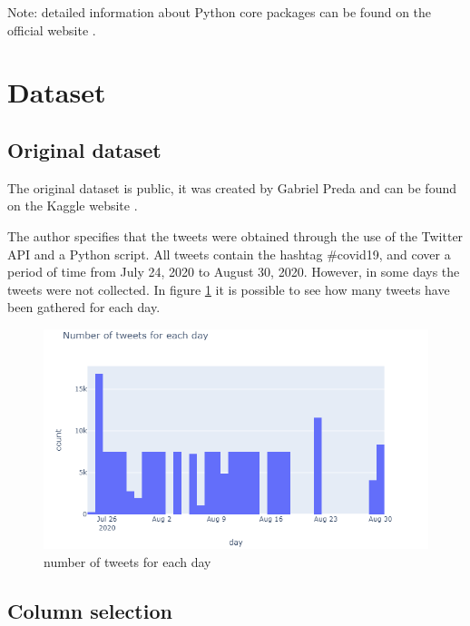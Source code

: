 \vspace{4mm}
Note: detailed information about Python core packages can be found on the official website \cite{python_website}. 


\section{Dataset}\label{sect_dataset}

\subsection*{Original dataset}

The original dataset is public, it was created by Gabriel Preda and can be found on the Kaggle website \cite{kaggle_df}.

The author specifies that the tweets were obtained through the use of the Twitter API and a Python script. All tweets contain the hashtag \#covid19, and cover a period of time from July 24, 2020 to August 30, 2020. However, in some days the tweets were not collected. In figure \ref{dates_and_tweets} it is possible to see how many tweets have been gathered for each day. 

\begin{figure}[h]
  \includegraphics[scale=0.44]{dates_and_tweets.png}
  \centering
  \caption{number of tweets for each day}
  \label{dates_and_tweets}
\end{figure}

\subsection*{Column selection}


